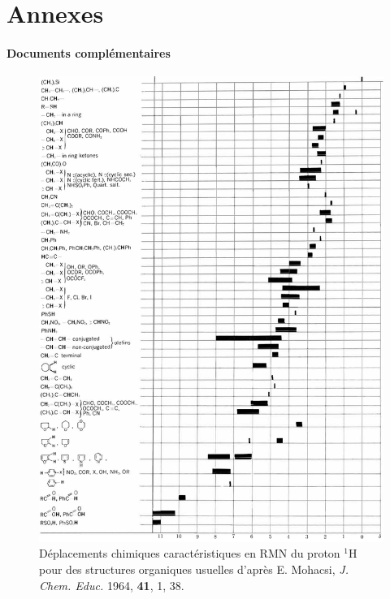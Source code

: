 \part*{Annexes}
\appendix

\subsection*{Documents complémentaires}
\begin{figure}[H]
    {\centering\includegraphics[width=\linewidth]{chimiePC/misc/RMN.png}}
    Déplacements chimiques caractéristiques en RMN du proton $^{1}$H pour des structures organiques usuelles d'après E. Mohacsi, \emph{J. Chem. Educ.} 1964, \textbf{41}, 1, 38.
\end{figure}

